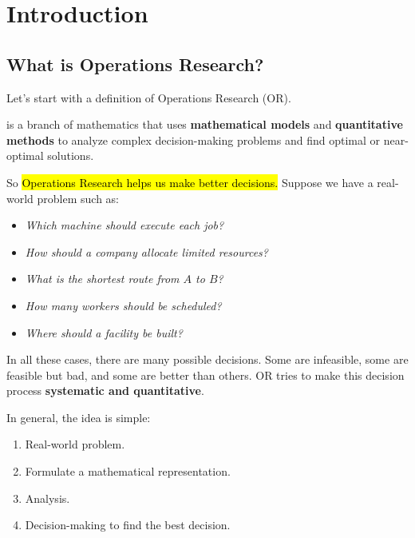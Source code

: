 \section{Introduction}\label{sec:introduction}

\subsection{What is Operations Research?}\label{sec:introduction:what-is-operations-research}

Let's start with a definition of Operations Research (OR).

\highspace
\begin{definitionbox}
     is a branch of mathematics that uses \textbf{mathematical models} and \textbf{quantitative methods} to analyze complex decision-making problems and find optimal or near-optimal solutions.
\end{definitionbox}

\highspace
So \hl{Operations Research helps us make better decisions.} Suppose we have a real-world problem such as:
\begin{itemize}
    \item \emph{Which machine should execute each job?}
    \item \emph{How should a company allocate limited resources?}
    \item \emph{What is the shortest route from $A$ to $B$?}
    \item \emph{How many workers should be scheduled?}
    \item \emph{Where should a facility be built?}
\end{itemize}
In all these cases, there are many possible decisions. Some are infeasible, some are feasible but bad, and some are better than others. OR tries to make this decision process \textbf{systematic and quantitative}.

\highspace
In general, the idea is simple:
\begin{enumerate}
    \item Real-world problem.
    \item Formulate a mathematical representation.
    \item Analysis.
    \item Decision-making to find the best decision.
\end{enumerate}

